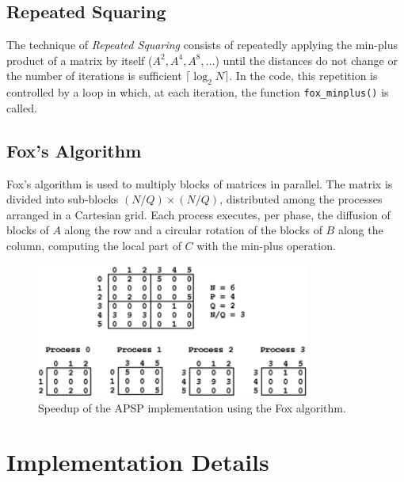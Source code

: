 \documentclass[10pt,a4paper]{article}
\begin{document}
\subsection{Repeated Squaring}
The technique of \emph{Repeated Squaring} consists of repeatedly applying the min-plus product of a matrix by itself (\(A^2, A^4, A^8, \ldots\)) until the distances do not change or the number of iterations is sufficient \(\bigl\lceil \log_{2} N \bigr\rceil\). In the code, this repetition is controlled by a loop in which, at each iteration, the function \texttt{fox\_minplus()} is called.

\subsection{Fox's Algorithm}
Fox's algorithm is used to multiply blocks of matrices in parallel. The matrix is divided into sub-blocks \((N/Q) \times (N/Q)\), distributed among the processes arranged in a Cartesian grid. Each process executes, per phase, the diffusion of blocks of \(A\) along the row and a circular rotation of the blocks of \(B\) along the column, computing the local part of \(C\) with the min-plus operation.

\begin{figure}[H]
  \centering
  \includegraphics[width=0.8\textwidth]{matrix_foxImage.png}
  \caption{Speedup of the APSP implementation using the Fox algorithm.}
  \label{fig:speedup}
\end{figure}

\section{Implementation Details}
\end{document}
